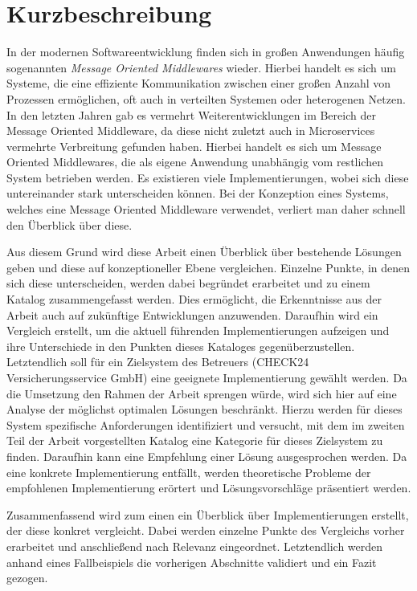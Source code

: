 \chapter*{Kurzbeschreibung}
In der modernen Softwareentwicklung finden sich in großen Anwendungen häufig
sogenannten \textit{Message Oriented Middlewares} wieder. Hierbei handelt es sich
um Systeme, die eine effiziente Kommunikation zwischen einer großen Anzahl
von Prozessen ermöglichen, oft auch in verteilten Systemen oder heterogenen
Netzen. In den letzten Jahren gab es vermehrt Weiterentwicklungen im Bereich
der Message Oriented Middleware, da diese nicht zuletzt auch in Microservices
vermehrte Verbreitung gefunden haben.
Hierbei handelt es sich um Message Oriented Middlewares, die als eigene
Anwendung unabhängig vom restlichen System betrieben werden.
Es existieren viele Implementierungen, wobei sich diese untereinander
stark unterscheiden können.
Bei der Konzeption eines Systems, welches eine Message Oriented Middleware verwendet, 
verliert man daher schnell den Überblick über diese.

Aus diesem Grund wird diese Arbeit einen Überblick über bestehende Lösungen geben und diese
auf konzeptioneller Ebene vergleichen. Einzelne Punkte, in denen sich diese
unterscheiden, werden dabei begründet erarbeitet und zu einem Katalog
zusammengefasst werden. 
Dies ermöglicht, die Erkenntnisse aus der Arbeit
auch auf zukünftige Entwicklungen anzuwenden.
Daraufhin wird ein Vergleich erstellt, um die aktuell führenden Implementierungen aufzeigen
und ihre Unterschiede in den Punkten dieses Kataloges gegenüberzustellen. 
Letztendlich soll für ein Zielsystem des Betreuers
(CHECK24 Versicherungsservice GmbH) eine geeignete Implementierung
gewählt werden. Da die Umsetzung den Rahmen der Arbeit sprengen würde, wird
sich hier auf eine Analyse der möglichst optimalen Lösungen beschränkt.
Hierzu werden für dieses System spezifische Anforderungen identifiziert und
versucht, mit dem im zweiten Teil der Arbeit vorgestellten Katalog eine 
Kategorie für dieses Zielsystem zu finden. Daraufhin kann eine Empfehlung einer Lösung ausgesprochen
werden. Da eine konkrete Implementierung entfällt, werden theoretische Probleme
der empfohlenen Implementierung erörtert und Lösungsvorschläge präsentiert werden.

Zusammenfassend wird zum einen ein Überblick über Implementierungen erstellt,
der diese konkret vergleicht. Dabei werden einzelne Punkte des Vergleichs vorher
erarbeitet und anschließend nach Relevanz eingeordnet. Letztendlich werden
anhand eines Fallbeispiels die vorherigen Abschnitte validiert und ein Fazit
gezogen.
